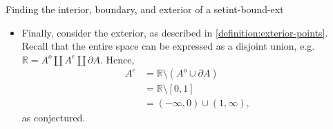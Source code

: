 \documentclass{article}
\numberwithin{equation}{section}
\numberwithin{figure}{section}
\begin{document}
\begin{example}{Finding the interior, boundary, and exterior of a
        set}{int-bound-ext}
\begin{itemize}
            Now, we show that there are no other boundary points of $ A $ in $
            \mathbb{R} $. We know that $ \mathbb{R} = A^o \coprod \partial A
            \coprod A^e $, hence $ A^o \cup \partial A = \emptyset $, thus $ (0,
            1) \not\subset \partial A $. Without loss of generality for $ x < 0
            $, consider points $ x > 1 $. Therefore, there exists an $ \epsilon
            > 0 $ such that $ x = 1 + \epsilon $. Considering $ B(x, \epsilon/2)
            $, we can see that $ B(x, \epsilon/2) \subset A^c $, which implies
            that $ B(x, \epsilon/2) \cap A = \emptyset $. Thus, $ \{ 0, 1 \} =
            \partial A $.
        \item Finally, consider the exterior, as described in
            \cref{definition:exterior-points}. Recall that the entire space can
            be expressed as a disjoint union, e.g. $ \mathbb{R} = A^o \coprod
            A^e \coprod \partial A $. Hence,
            \begin{align}
                A^e &= \mathbb{R} \setminus \left( A^o \cup \partial A
                    \right) \\
                &= \mathbb{R} \setminus [0, 1] \\
                &= (-\infty, 0) \cup (1, \infty),
            \end{align}
            as conjectured.
    \end{itemize}
\end{example}
\end{document}
